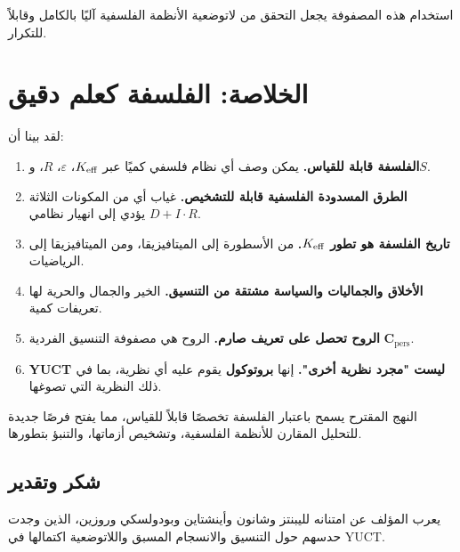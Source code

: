 \documentclass[11pt,a4paper]{article}
\newcommand{\eps}{\varepsilon}
\newcommand{\Cpers}{\mathbf{C}_{\text{pers}}}
\begin{document}
	استخدام هذه المصفوفة يجعل التحقق من لاتوضعية الأنظمة الفلسفية آليًا بالكامل وقابلاً للتكرار.
	
	
	\section{الخلاصة: الفلسفة كعلم دقيق}
	
	لقد بينا أن:
	
	\begin{enumerate}
		\item \textbf{الفلسفة قابلة للقياس.} يمكن وصف أي نظام فلسفي كميًا عبر \(\Keff\)، \(\eps\)، \(R\)، و\(S\).
		\item \textbf{الطرق المسدودة الفلسفية قابلة للتشخيص.} غياب أي من المكونات الثلاثة \(D + I \cdot R\) يؤدي إلى انهيار نظامي.
		\item \textbf{تاريخ الفلسفة هو تطور \(\Keff\).} من الأسطورة إلى الميتافيزيقا، ومن الميتافيزيقا إلى الرياضيات.
		\item \textbf{الأخلاق والجماليات والسياسة مشتقة من التنسيق.} الخير والجمال والحرية لها تعريفات كمية.
		\item \textbf{الروح تحصل على تعريف صارم.} الروح هي مصفوفة التنسيق الفردية \(\Cpers\).
		\item \textbf{YUCT ليست "مجرد نظرية أخرى".} إنها \textbf{بروتوكول} يقوم عليه أي نظرية، بما في ذلك النظرية التي تصوغها.
	\end{enumerate}
	
	النهج المقترح يسمح باعتبار الفلسفة تخصصًا قابلاً للقياس، مما يفتح فرصًا جديدة للتحليل المقارن للأنظمة الفلسفية، وتشخيص أزماتها، والتنبؤ بتطورها.
	
	\begin{center}
	\end{center}
	
	\subsection*{شكر وتقدير}
	
	يعرب المؤلف عن امتنانه لليبنتز وشانون وأينشتاين وبودولسكي وروزين، الذين وجدت حدسهم حول التنسيق والانسجام المسبق واللاتوضعية اكتمالها في YUCT.
	
\end{document}
